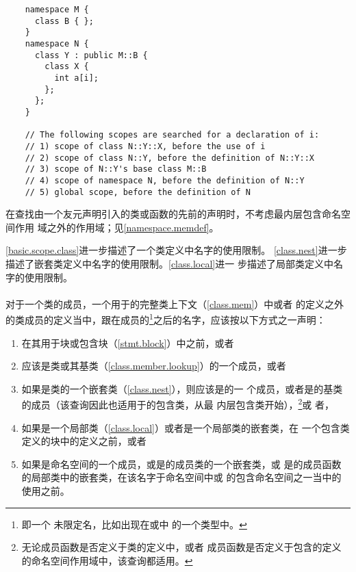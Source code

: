\begin{example}
  \begin{lstlisting}
    namespace M {
      class B { };
    }
    namespace N {
      class Y : public M::B {
        class X {
          int a[i];
        };
      };
    }

    // The following scopes are searched for a declaration of i:
    // 1) scope of class N::Y::X, before the use of i
    // 2) scope of class N::Y, before the definition of N::Y::X
    // 3) scope of N::Y's base class M::B
    // 4) scope of namespace N, before the definition of N::Y
    // 5) global scope, before the definition of N
  \end{lstlisting}
\end{example}

\begin{note}
  在查找由一个友元声明引入的类或函数的先前的声明时，不考虑最内层包含命名空间作用
  域之外的作用域；见\ref{namespace.memdef}。
\end{note}

\begin{note}
  \ref{basic.scope.class}进一步描述了一个类定义中名字的使用限制。
  \ref{class.nest}进一步描述了嵌套类定义中名字的使用限制。\ref{class.local}进一
  步描述了局部类定义中名字的使用限制。
\end{note}

\paragraph{} %
对于一个类的成员，一个用于的完整类上下文（\ref{class.mem}）中或者
的定义之外的类成员的定义当中，跟在成员的\footnote{即一个
未限定名，比如出现在或中
的一个类型中。}之后的名字，应该按以下方式之一声明：
\begin{enumerate}
  \item 在其用于块或包含块（\ref{stmt.block}）中之前，或者
  \item 应该是类或其基类（\ref{class.member.lookup}）的一个成员，或者
  \item 如果是类的一个嵌套类（\ref{class.nest}），则应该是的一
        个成员，或者是的基类的成员（该查询因此也适用于的包含类，从最
        内层包含类开始），\footnote{无论成员函数是否定义于类的定义中，或者
        成员函数是否定义于包含的定义的命名空间作用域中，该查询都适用。}或
        者，
  \item 如果是一个局部类（\ref{class.local}）或者是一个局部类的嵌套类，在
        一个包含类定义的块中的定义之前，或者
  \item 如果是命名空间的一个成员，或是的成员类的一个嵌套类，或
        是的成员函数的局部类中的嵌套类，在该名字于命名空间中或
        的包含命名空间之一当中的使用之前。
\end{enumerate}

